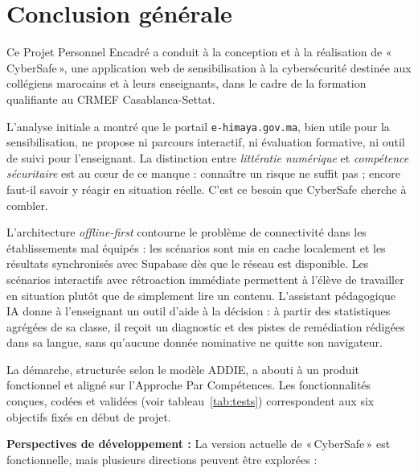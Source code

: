 \documentclass[12pt, a4paper, oneside]{report}
\begin{document}
\chapter*{Conclusion générale}

Ce Projet Personnel Encadré a conduit à la conception et à la réalisation de «\,CyberSafe\,», une application web de sensibilisation à la cybersécurité destinée aux collégiens marocains et à leurs enseignants, dans le cadre de la formation qualifiante au CRMEF Casablanca-Settat.

L'analyse initiale a montré que le portail \texttt{e-himaya.gov.ma}, bien utile pour la sensibilisation, ne propose ni parcours interactif, ni évaluation formative, ni outil de suivi pour l'enseignant. La distinction entre \textit{littératie numérique} et \textit{compétence sécuritaire} est au cœur de ce manque : connaître un risque ne suffit pas ; encore faut-il savoir y réagir en situation réelle. C'est ce besoin que CyberSafe cherche à combler.

L'architecture \textit{offline-first} contourne le problème de connectivité dans les établissements mal équipés : les scénarios sont mis en cache localement et les résultats synchronisés avec Supabase dès que le réseau est disponible. Les scénarios interactifs avec rétroaction immédiate permettent à l'élève de travailler en situation plutôt que de simplement lire un contenu. L'assistant pédagogique IA donne à l'enseignant un outil d'aide à la décision : à partir des statistiques agrégées de sa classe, il reçoit un diagnostic et des pistes de remédiation rédigées dans sa langue, sans qu'aucune donnée nominative ne quitte son navigateur.

La démarche, structurée selon le modèle ADDIE, a abouti à un produit fonctionnel et aligné sur l'Approche Par Compétences. Les fonctionnalités conçues, codées et validées (voir tableau~\ref{tab:tests}) correspondent aux six objectifs fixés en début de projet.

\textbf{Perspectives de développement :}
La version actuelle de «\,CyberSafe\,» est fonctionnelle, mais plusieurs directions peuvent être explorées :
\end{document}
